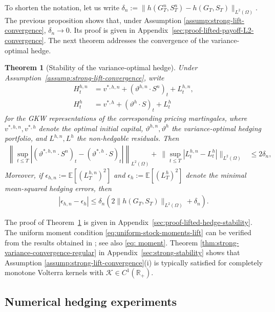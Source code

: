 \documentclass[10pt,a4paper,reqno]{amsart}
\theoremstyle{plain}
\newtheorem{theorem}{Theorem}[section]
\theoremstyle{definition}
\theoremstyle{remark}
\theoremstyle{example}
\begin{document}
To shorten the notation, let us write $\delta_n := \|h(G_T^n, S_T^n) - h(G_T, S_T)\|_{L^2(\Omega)}$. The previous proposition shows that, under Assumption \ref{assump:strong-lift-convergence}, $\delta_n \to 0$. Its proof is given in Appendix~\ref{sec:proof-lifted-payoff-L2-convergence}. The next theorem addresses the convergence of the variance-optimal hedge. 

\begin{theorem}[Stability of the variance-optimal hedge]
\label{thm:lifted-hedge-stability}
Under Assumption~\ref{assump:strong-lift-convergence}, write
\begin{align*}
    H_t^{h,n} &= v^{*,h,n} + (\vartheta^{h,n} \cdot S^n)_t + L_t^{h,n},
    \\ H_t^{h} &= v^{*,h} + (\vartheta^{h} \cdot S)_t + L_t^{h}
\end{align*}
for the GKW representations of the corresponding pricing martingales, where $v^{*,h,n}, v^{*,h}$ denote the optimal initial capital, $\vartheta^{h,n}, \vartheta^h$ the variance-optimal hedging portfolio, and $L^{h,n}, L^h$ the non-hedgable residuals. Then 
\begin{align}\label{eq:gains-convergence-lift}
    \left\| \sup_{t \leq T}|(\vartheta^{*,h,n}\cdot S^n)_t - (\vartheta^{*,h}\cdot S)_t| \right\|_{L^2(\Omega)} + \ \|\sup_{t \leq T}|L_t^{h,n}-L_t^h|\|_{L^2(\Omega)} &\leq 2\delta_n,
\end{align}
Moreover, if $\epsilon_{h,n} := \mathbb E[ (L_T^{h,n})^2 ]$ and $\epsilon_h := \mathbb E[ (L_T^h)^2 ]$ denote the minimal mean-squared hedging errors, then
\begin{align}\label{eq:minimal-error-bound}
    |\epsilon_{h,n}-\epsilon_h| \leq \delta_n \left( 2\|h(G_T, S_T)\|_{L^2(\Omega)} + \delta_n \right).
\end{align}
\end{theorem}

The proof of Theorem~\ref{thm:lifted-hedge-stability} is given in Appendix~\ref{sec:proof-lifted-hedge-stability}.
The uniform moment condition \eqref{eq:uniform-stock-moments-lift} can be verified from the results obtained in \cite{gerhold2019moment, MR4099324}; see also \eqref{eq: moment}. Theorem \ref{thm:strong-variance-convergence-regular} in Appendix~\ref{sec:strong-stability} shows that Assumption \ref{assump:strong-lift-convergence}(i) is typically satisfied for completely monotone Volterra kernels with $\mathcal K\in C^1(\mathbb{R}_+)$.




 \subsection{Numerical hedging experiments}\label{sec:numericshedging}
\end{document}
